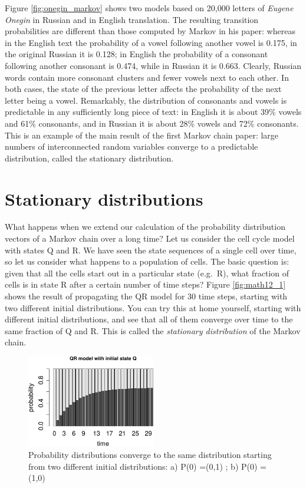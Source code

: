 \documentclass[
  letterpaper,
  DIV=11,
  numbers=noendperiod]{scrreprt}
\begin{document}
Figure \ref{fig:onegin_markov} shows two models based on 20,000 letters
of \emph{Eugene Onegin} in Russian and in English translation. The
resulting transition probabilities are different than those computed by
Markov in his paper: whereas in the English text the probability of a
vowel following another vowel is 0.175, in the original Russian it is
0.128; in English the probability of a consonant following another
consonant is 0.474, while in Russian it is 0.663. Clearly, Russian words
contain more consonant clusters and fewer vowels next to each other. In
both cases, the state of the previous letter affects the probability of
the next letter being a vowel. Remarkably, the distribution of
consonants and vowels is predictable in any sufficiently long piece of
text: in English it is about 39\% vowels and 61\% consonants, and in
Russian it is about 28\% vowels and 72\% consonants. This is an example
of the main result of the first Markov chain paper: large numbers of
interconnected random variables converge to a predictable distribution,
called the stationary distribution.

\hypertarget{stationary-distributions}{%
\section{Stationary distributions}\label{stationary-distributions}}

What happens when we extend our calculation of the probability
distribution vectors of a Markov chain over a long time? Let us consider
the cell cycle model with states Q and R. We have seen the state
sequences of a single cell over time, so let us consider what happens to
a population of cells. The basic question is: given that all the cells
start out in a particular state (e.g.~R), what fraction of cells is in
state R after a certain number of time steps? Figure \ref{fig:math12_1}
shows the result of propagating the QR model for 30 time steps, starting
with two different initial distributions. You can try this at home
yourself, starting with different initial distributions, and see that
all of them converge over time to the same fraction of Q and R. This is
called the \emph{stationary distribution} of the Markov chain.

\begin{figure}

{\centering \includegraphics[width=0.5\textwidth,height=\textheight]{./markov_stat_files/figure-pdf/stat-mark-1.pdf}

}

\caption{Probability distributions converge to the same distribution
starting from two different initial distributions: a) P(0) =(0,1) ; b)
P(0) =(1,0)}

\end{figure}
\end{document}
